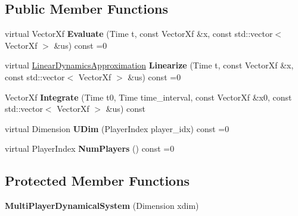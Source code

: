 \subsection*{Public Member Functions}
\begin{DoxyCompactItemize}
\item 
virtual Vector\+Xf {\bfseries Evaluate} (Time t, const Vector\+Xf \&x, const std\+::vector$<$ Vector\+Xf $>$ \&us) const =0\hypertarget{classilqgames_1_1_multi_player_dynamical_system_a66a5536c8b8995b26f1d5520026a6ad8}{}\label{classilqgames_1_1_multi_player_dynamical_system_a66a5536c8b8995b26f1d5520026a6ad8}

\item 
virtual \hyperlink{structilqgames_1_1_linear_dynamics_approximation}{Linear\+Dynamics\+Approximation} {\bfseries Linearize} (Time t, const Vector\+Xf \&x, const std\+::vector$<$ Vector\+Xf $>$ \&us) const =0\hypertarget{classilqgames_1_1_multi_player_dynamical_system_ace8dae90eae7aa2e0a327855f77c38d1}{}\label{classilqgames_1_1_multi_player_dynamical_system_ace8dae90eae7aa2e0a327855f77c38d1}

\item 
Vector\+Xf {\bfseries Integrate} (Time t0, Time time\+\_\+interval, const Vector\+Xf \&x0, const std\+::vector$<$ Vector\+Xf $>$ \&us) const \hypertarget{classilqgames_1_1_multi_player_dynamical_system_afddeafb94e74a19cdba2736f4a7a8050}{}\label{classilqgames_1_1_multi_player_dynamical_system_afddeafb94e74a19cdba2736f4a7a8050}

\item 
virtual Dimension {\bfseries U\+Dim} (Player\+Index player\+\_\+idx) const =0\hypertarget{classilqgames_1_1_multi_player_dynamical_system_a646bbfa93e8f222a223053a4e939aed0}{}\label{classilqgames_1_1_multi_player_dynamical_system_a646bbfa93e8f222a223053a4e939aed0}

\item 
virtual Player\+Index {\bfseries Num\+Players} () const =0\hypertarget{classilqgames_1_1_multi_player_dynamical_system_ad9ef05f4bd53279bec609525e7ac4dd7}{}\label{classilqgames_1_1_multi_player_dynamical_system_ad9ef05f4bd53279bec609525e7ac4dd7}

\end{DoxyCompactItemize}
\subsection*{Protected Member Functions}
\begin{DoxyCompactItemize}
\item 
{\bfseries Multi\+Player\+Dynamical\+System} (Dimension xdim)\hypertarget{classilqgames_1_1_multi_player_dynamical_system_a06e2300d28448e4135b7ca600f3828a6}{}\label{classilqgames_1_1_multi_player_dynamical_system_a06e2300d28448e4135b7ca600f3828a6}

\end{DoxyCompactItemize}
